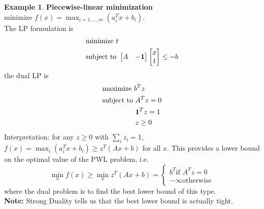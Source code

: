 \documentclass[10pt]{article}
\theoremstyle{definition}
\newtheorem{example}{Example}[section]
\newcommand{\Note}[0]{\noindent\textbf{Note: }}
\begin{document}
\begin{example} \textbf{Piecewise-linear minimization}\\
	minimize $f(x) = \max_{i = 1, \dots, m}(a_{i}^Tx + b_{i})$.\\
	The LP formulation is 
	\begin{equation*}
		\begin{split}
			&\text{minimize } t\\
			& \text{subject to } 
			\begin{bmatrix}
				A & {\bf-1}
			\end{bmatrix}
			\begin{bmatrix}
				x \\ t
			\end{bmatrix} \le -b
		\end{split}
	\end{equation*}
	the dual LP is
	\begin{equation*}
		\begin{split}
			&\text{maximize } b^Tz\\
			&\begin{split}
				\text{subject to } &A^Tz = 0 \\
				& {\bf 1}^Tz= 1 \\
				& z \ge 0
			\end{split}
		\end{split}
	\end{equation*}
	Interpretation: for any $z \ge 0$ with $\sum_{i}z_{i} = 1$,
	 $f(x) = \max_{i}(a_{i}^Tx + b_{i}) \ge z^T(Ax + b)$ for all $x$.
	 This provides a lower bound on the optimal value of the PWL problem, i.e.
	 \begin{equation*}
		 \min_{x} f(x) \ge \min_{x} z^T(Ax + b) = \begin{cases}
			 b^T \text{if } A^Tz = 0 \\ 
			 -\infty \text{otherwise}
		 \end{cases}
	 \end{equation*}
	 where the dual problem is to find the best lower bound of this type.\\
	 \Note Strong Duality tells us that the best lower bound is actually tight.
\end{example}
\end{document}
